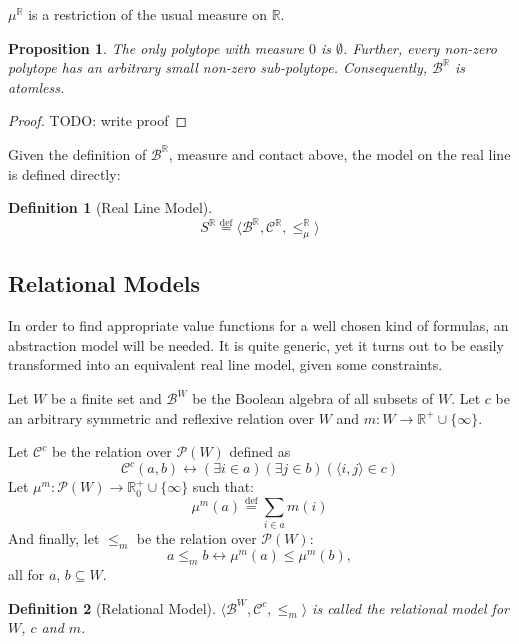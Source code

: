 \documentclass{article}
\newtheorem*{definition}{Definition}
\newtheorem*{proposition}{Proposition}
\newcommand{\R}{\mathbb{R}}
\newcommand{\pwrset}{\mathcal{P}}
\newcommand{\B}{\mathcal{B}}
\newcommand{\bcont}{\mathcal{C}^\R}
\newcommand{\bmeasure}{\leq_\mu^\R}
\newcommand{\eqdef}{\stackrel{\text{def}}{=}}
\begin{document}
$\mu^\R$ is a restriction of the usual measure on $\R$.

\begin{proposition}
The only polytope with measure $0$ is $\emptyset$. Further, every non-zero polytope has an arbitrary small non-zero sub-polytope. Consequently, $\B^\R$ is atomless.
\end{proposition}
\begin{proof}
  TODO: write proof
\end{proof}

Given the definition of $\B^\R$, measure and contact above, the model on the real line is defined directly:

\begin{definition}[Real Line Model]
  \begin{equation*}
    S^\R \eqdef \langle \B^\R, \bcont, \bmeasure \rangle
  \end{equation*}
\end{definition}

\subsection{Relational Models}
In order to find appropriate value functions for a well chosen kind of formulas, an abstraction model will be needed. It is quite generic, yet it turns out to be easily transformed into an equivalent real line model, given some constraints.

Let $W$ be a finite set and $\B^W$ be the Boolean algebra of all subsets of $W$. Let $c$ be an arbitrary symmetric and reflexive relation over $W$ and $m: W \rightarrow \R^+ \cup \{\infty\}$.

Let $\mathcal{C}^c$ be the relation over $\pwrset(W)$ defined as
\begin{equation*}
  \mathcal{C}^c(a, b) \longleftrightarrow (\exists i \in a)(\exists j \in b)(\langle i, j \rangle \in c)
\end{equation*}
Let $\mu^m: \pwrset(W) \rightarrow \R_0^+ \cup \{\infty\}$ such that:
\begin{equation*}
  \mu^m(a) \eqdef \sum_{i \in a}m(i)
\end{equation*}
And finally, let $\leq_m$ be the relation over $\pwrset(W)$:
\begin{equation*}
  a \leq_m b \longleftrightarrow \mu^m(a) \leq \mu^m(b),
\end{equation*}
all for $a$, $b \subseteq W$.
\begin{definition}[Relational Model]
$\langle \B^W, \mathcal{C}^c, \leq_m \rangle$ is called the \emph{relational model for $W$, $c$ and $m$}.
\end{definition}
\end{document}
